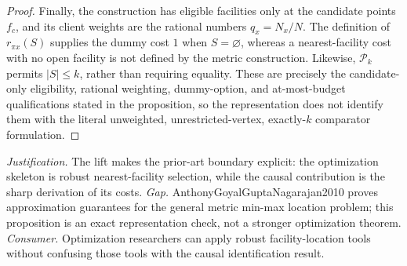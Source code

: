 \documentclass{article}
\begin{document}
\begin{proof}
Finally, the construction has eligible facilities only at the candidate points \(f_c\), and its client weights are the rational numbers \(q_x=N_x/N\).  The definition of \(r_{\pi x}(S)\) supplies the dummy cost \(1\) when \(S=\varnothing\), whereas a nearest-facility cost with no open facility is not defined by the metric construction.  Likewise, \(\mathcal P_k\) permits \(|S|\leq k\), rather than requiring equality.  These are precisely the candidate-only eligibility, rational weighting, dummy-option, and at-most-budget qualifications stated in the proposition, so the representation does not identify them with the literal unweighted, unrestricted-vertex, exactly-\(k\) comparator formulation.
\end{proof}
\par\smallskip\noindent \textit{Justification.} The lift makes the prior-art boundary explicit: the optimization skeleton is robust nearest-facility selection, while the causal contribution is the sharp derivation of its costs. \textit{Gap.} AnthonyGoyalGuptaNagarajan2010 proves approximation guarantees for the general metric min-max location problem; this proposition is an exact representation check, not a stronger optimization theorem. \textit{Consumer.} Optimization researchers can apply robust facility-location tools without confusing those tools with the causal identification result.
\end{document}
